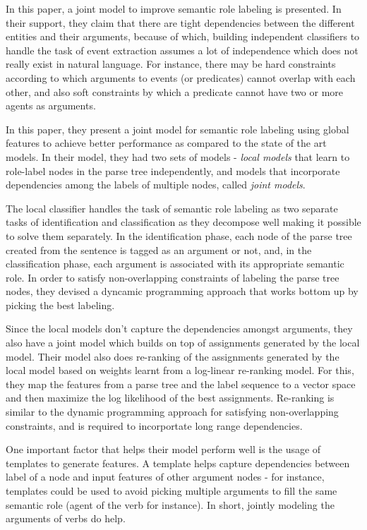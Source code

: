 In this paper, a joint model to improve semantic role labeling is presented. In their support, they claim that there are tight dependencies between the different entities and their arguments, because of which, building independent classifiers to handle the task of event extraction assumes a lot of independence which does not really exist in natural language. For instance, there may be hard constraints according to which arguments to events (or predicates) cannot overlap with each other, and also soft constraints by which a predicate cannot have two or more agents as arguments. 

In this paper, they present a joint model for semantic role labeling using global features to achieve better performance as compared to the state of the art models. In their model, they had two sets of models - \emph{local models} that learn to role-label nodes in the parse tree independently, and models that incorporate dependencies among the labels of multiple nodes, called \emph{joint models}. 

The local classifier handles the task of semantic role labeling as two separate tasks of identification and classification as they decompose well making it possible to solve them separately. In the identification phase, each node of the parse tree created from the sentence is tagged as an argument or not, and, in the classification phase, each argument is associated with its appropriate semantic role. In order to satisfy non-overlapping constraints of labeling the parse tree nodes, they devised a dyncamic programming approach that works bottom up by picking the best labeling. 

Since the local models don't capture the dependencies amongst arguments, they also have a joint model which builds on top of assignments generated by the local model. Their model also does re-ranking of the assignments generated by the local model based on weights learnt from a log-linear re-ranking model. For this, they map the features from a parse tree and the label sequence to a vector space and then maximize the log likelihood of the best assignments. Re-ranking is similar to the dynamic programming approach for satisfying non-overlapping constraints, and is required to incorportate long range dependencies. 

One important factor that helps their model perform well is the usage of templates to generate features. A template helps capture dependencies between label of a node and input features of other argument nodes - for instance, templates could be used to avoid picking multiple arguments to fill the same semantic role (agent of the verb for instance). In short, jointly modeling the arguments of verbs do help.\\

